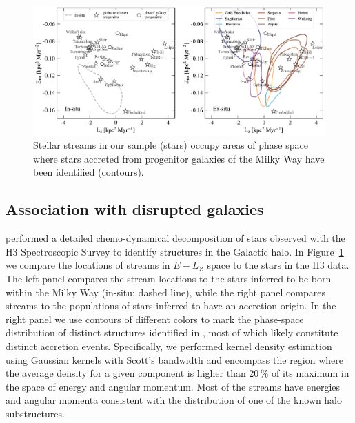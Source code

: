 \documentclass[twocolumn]{aastex63}
\begin{document}
\begin{figure}
\begin{center}
\includegraphics[width=\textwidth]{stream_hosts.pdf}
\end{center}
\caption{
Stellar streams in our sample (stars) occupy areas of phase space where stars accreted from progenitor galaxies of the Milky Way have been identified (contours).
}
\label{fig:hosts}
\end{figure}

\subsection{Association with disrupted galaxies}
\label{sec:hosts}

\citet{naidu2020} performed a detailed chemo-dynamical decomposition of stars observed with the H3 Spectroscopic Survey to identify structures in the Galactic halo.
In Figure~\ref{fig:hosts} we compare the locations of streams in $E-L_Z$ space to the stars in the H3 data.  
The left panel compares the stream locations to the stars inferred to be born within the Milky Way (in-situ; dashed line), while the right panel compares streams to the populations of stars inferred to have an accretion origin.  
In the right panel we use contours of different colors to mark the phase-space distribution of distinct structures identified in \citet{naidu2020}, most of which likely constitute distinct accretion events.
Specifically, we performed kernel density estimation using Gaussian kernels with Scott's bandwidth and encompass the region where the average density for a given component is higher than 20\,\% of its maximum in the space of energy and angular momentum.
Most of the streams have energies and angular momenta consistent with the distribution of one of the known halo substructures.
\end{document}
